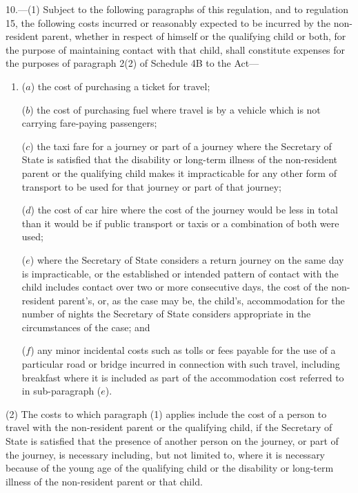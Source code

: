 \documentclass[12pt,a4paper]{article}
\begin{document}
\renewcommand\parthead{--- Part III}

10.---(1)  Subject to the following paragraphs of this regulation, and to regulation 15, the following costs incurred or reasonably expected to be incurred by the non-resident parent, whether in respect of himself or the qualifying child or both, for the purpose of maintaining contact with that child, shall constitute expenses for the purposes of paragraph 2(2) of Schedule 4B to the Act—
\begin{enumerate}\item[]
($a$) the cost of purchasing a ticket for travel;

($b$) the cost of purchasing fuel where travel is by a vehicle which is not carrying fare-paying passengers;

($c$) the taxi fare for a journey or part of a journey where the Secretary of State is satisfied that the disability or long-term illness of the non-resident parent or the qualifying child makes it impracticable for any other form of transport to be used for that journey or part of that journey;

($d$) the cost of car hire where the cost of the journey would be less in total than it would be if public transport or taxis or a combination of both were used;

($e$) where the Secretary of State considers a return journey on the same day is impracticable, or the established or intended pattern of contact with the child includes contact over two or more consecutive days, the cost of the non-resident parent's, or, as the case may be, the child's, accommodation for the number of nights the Secretary of State considers appropriate in the circumstances of the case; and

($f$) any minor incidental costs such as tolls or fees payable for the use of a particular road or bridge incurred in connection with such travel, including breakfast where it is included as part of the accommodation cost referred to in sub-paragraph ($e$).
\end{enumerate}

(2) The costs to which paragraph (1) applies include the cost of a person to travel with the non-resident parent or the qualifying child, if the Secretary of State is satisfied that the presence of another person on the journey, or part of the journey, is necessary including, but not limited to, where it is necessary because of the young age of the qualifying child or the disability or long-term illness of the non-resident parent or that child.
\end{document}
